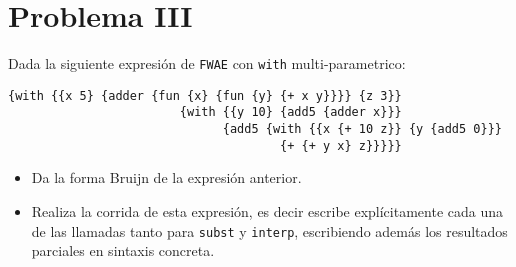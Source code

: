 \documentclass{article}
\begin{document}
\section{Problema III}
Dada la siguiente expresión de \texttt{FWAE} con \verb;with; multi-parametrico:
\begin{verbatim}
{with {{x 5} {adder {fun {x} {fun {y} {+ x y}}}} {z 3}}
                        {with {{y 10} {add5 {adder x}}}
                              {add5 {with {{x {+ 10 z}} {y {add5 0}}}
                                      {+ {+ y x} z}}}}}
\end{verbatim}
\begin{itemize}
\item Da la forma Bruijn de la expresión anterior.
\item Realiza la corrida de esta expresión, es decir escribe explícitamente cada una de las llamadas tanto para \texttt{subst} y \texttt{interp}, escribiendo además los resultados parciales en sintaxis concreta.
\end{itemize}
\end{document}
